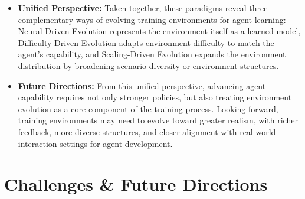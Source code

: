 \documentclass{llmxive}
\begin{document}
\begin{tcolorbox}[takeaway,title={Takeaway 7}]
\begin{itemize}
\item \textbf{Unified Perspective:}
%
%
Taken together, these paradigms reveal three complementary ways of evolving training environments for agent learning:
Neural-Driven Evolution represents the environment itself as a learned model,
Difficulty-Driven Evolution adapts environment difficulty to match the agent's capability,
and Scaling-Driven Evolution expands the environment distribution by broadening scenario diversity or environment structures.
%
\item \textbf{Future Directions:} From this unified perspective, advancing agent capability requires not only stronger policies, but also treating environment evolution as a core component of the training process.
Looking forward, training environments may need to evolve toward greater realism, with richer feedback, more diverse structures, and closer alignment with real-world interaction settings for agent development.


\end{itemize}
\end{tcolorbox}

\section{Challenges \& Future Directions}\label{sec:future}
\end{document}
